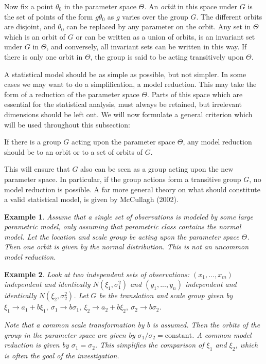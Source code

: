 \documentclass[a4paper, 11pt]{article}
\newtheorem{example}{Example}
\begin{document}
Now fix a point $\theta_0$ in the parameter space $\Theta$. An \emph{orbit} in this space under $G$ is the set of points of the form $g\theta_0 $ as $g$ varies over the group $G$. The different orbits are disjoint, and $\theta_0$ can be replaced by any parameter on the orbit. Any set in $\Theta$ which is an orbit of $G$ or can be written as a union of orbits, is an invariant set under $G$ in $\Theta$, and conversely, all invariant sets can be written in
this way. If there is only one orbit in $\Theta$, the group is said to be acting transitively upon $\Theta$.

A statistical model should be as simple as possible, but not simpler. In some cases we may want to do a simplification, a model reduction. This may take the form of a reduction of the parameter space $\Theta$. Parts of this space which
are essential for the statistical analysis, must always be retained, but irrelevant dimensions should be left out. We will now formulate a general criterion which will be used throughout this subsection:
\bigskip

\begin{principle}
  \label{principle1}
  If there is a group $G$ acting upon the parameter space $\Theta$, any model reduction should be to an orbit or to a set of orbits of $G$.
\end{principle}

This will ensure that $G$ also can be seen as a group acting upon the new parameter space. In particular, if the group actions form a transitive group $G$, no model reduction is possible. A far more general theory on what should constitute a valid statistical model, is given by McCullagh (2002).
\bigskip

\begin{example}
  Assume that a single set of observations is modeled by some large parametric model, only assuming that parametric class contains the normal model. Let the location and scale group be acting upon the parameter space $\Theta$. Then one orbit is given by the normal distribution. This is not an uncommon model reduction.
\end{example}

\smallskip

\begin{example}
  Look at two independent sets of observations: $(x_1 ,...,x_m )$ independent and identically $N(\xi_1,\sigma_1^2)$ and $(y_1 ,...,y_n )$ independent and identically $N(\xi_2 , \sigma_2 ^2)$. Let $G$ be the translation and scale group given by $\xi_1 \rightarrow a_1 +b\xi_1 ,\ \sigma_1 \rightarrow b\sigma_1 , \ \xi_2 \rightarrow a_2 +b\xi_2 ,\ \sigma_2 \rightarrow b\sigma_2 $.

  Note that a common scale transformation by $b$ is assumed. Then the orbits of the group in the parameter space are given by $\sigma_1 /\sigma_2 =\mathrm{constant}$. A common model reduction is given by $\sigma_1 =\sigma_2 $. This simplifies the comparison of $\xi_1 $ and $\xi_2 $, which is often the goal of the investigation.
\end{example}
\end{document}
